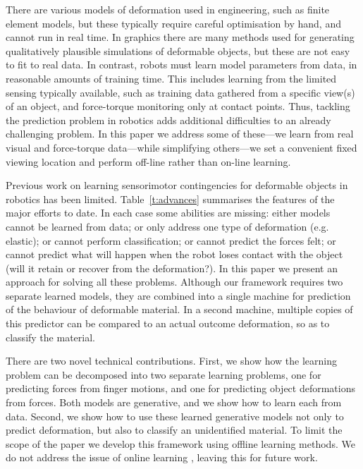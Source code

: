 \documentclass[journal]{IEEEtran}
\newcommand{\comment}[1]{{\color{red} #1}}
\begin{document}
There are various models of deformation used in engineering, such as finite element models, but these typically require careful optimisation by hand, and cannot run in real time. In graphics there are many methods used for generating qualitatively plausible simulations of deformable objects, but these are not easy to fit to real data. \comment{In contrast, robots must learn model parameters from data, in reasonable amounts of training time. This includes learning from the limited sensing typically available, such as training data gathered from a specific view(s) of an object, and force-torque monitoring only at contact points.} Thus, tackling the prediction problem in robotics adds additional difficulties to an already challenging problem. \comment{In this paper we address some of these---we learn from real visual and force-torque data---while simplifying others---we set a convenient fixed viewing location and perform off-line rather than on-line learning.}


Previous work on learning sensorimotor contingencies for deformable objects in robotics has been limited. Table~\ref{t:advances} summarises the features of the major efforts to date. In each case some abilities are missing: either models cannot be learned from data; or only address one type of deformation (e.g. elastic); or cannot perform classification; or cannot predict the forces felt; or cannot predict what will happen when the robot loses contact with the object (will it retain or recover from the deformation?). In this paper we present an approach for solving all these problems. Although our framework requires two separate learned models, they are combined into a single machine for prediction of the behaviour of deformable material. In a second machine, multiple copies of this predictor can be compared to an actual outcome deformation, so as to classify the material.

\comment{There are two novel technical contributions. First, we show how the learning problem can be decomposed into two separate learning problems, one for predicting forces from finger motions, and one for predicting object deformations from forces. Both models are generative, and we show how to learn each from data. Second, we show how to use these learned generative models not only to predict deformation, but also to classify an unidentified material. To limit the scope of the paper we develop this framework using offline learning methods. We do not address the issue of online learning \cite{worgotter09,antonelli14}, leaving this for future work.}
\end{document}
